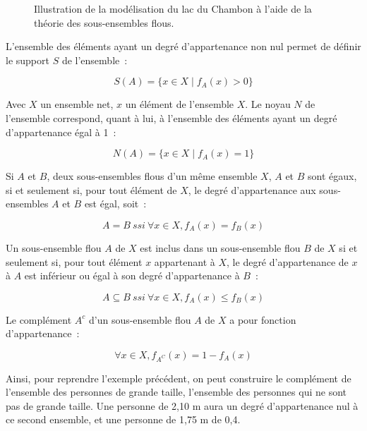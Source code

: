 \begin{figure}
  \centering
  \caption{Illustration de la modélisation du lac du Chambon à l’aide
    de la théorie des sous-ensembles flous.}
  \label{fig:champ_flou}
\end{figure}

L’ensemble des éléments ayant un degré d’appartenance non nul permet
de définir le support $S$ de l’ensemble :

\begin{equation}
  S(A) = \{x ∈ X \mid f_A(x) > 0\}
\end{equation}

Avec $X$ un ensemble net, $x$ un élément de l’ensemble $X$. Le noyau
$N$ de l’ensemble correspond, quant à lui, à l’ensemble des éléments
ayant un degré d’appartenance égal à 1 :

\begin{equation}
  N(A) = \{x ∈ X \mid f_A(x) = 1\}
\end{equation}

Si $A$ et $B$, deux sous-ensembles flous d’un même ensemble $X$, $A$
et $B$ sont égaux, si et seulement si, pour tout élément de $X$, le
degré d’appartenance aux sous-ensembles $A$ et $B$ est égal, soit :

\begin{equation}
  A = B\ ssi\ ∀x ∈ X, f_A(x) = f_B(x)
\end{equation}

Un sous-ensemble flou $A$ de $X$ est inclus dans un sous-ensemble flou
$B$ de $X$ si et seulement si, pour tout élément $x$ appartenant à
$X$, le degré d’appartenance de $x$ à $A$ est inférieur ou égal à son
degré d’appartenance à $B$ :

\begin{equation}
  A ⊆ B\ ssi\ ∀x ∈ X, f_A(x) ≤ f_B(x)
\end{equation}

Le complément $A^c$ d’un sous-ensemble flou $A$ de $X$ a pour fonction
d’appartenance :

\begin{equation}
  ∀x ∈ X, f_{A^C}(x) = 1 − f_A(x)
\end{equation}

Ainsi, pour reprendre l’exemple précédent, on peut construire le
complément de l’ensemble des personnes de grande taille, l’ensemble
des personnes qui ne sont pas de grande taille. Une personne de 2,10 m
aura un degré d’appartenance nul à ce second ensemble, et une personne
de 1,75 m de 0,4.

